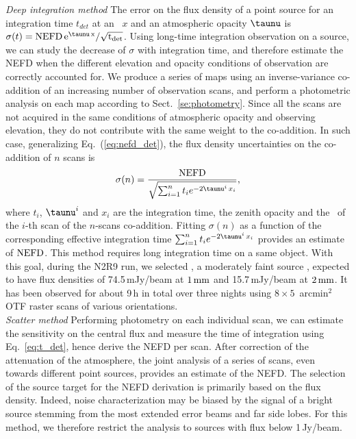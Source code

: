 \noindent \emph{Deep integration method} The error on the flux density of a
point source for an integration time $t_{det}$ at an \airmass\ $x$
and an atmospheric opacity $\taunu$ is
$\sigma(t) = \rm{NEFD}\,e^{\taunu \, x}/\sqrt{t_{\rm{det}}}$.
Using long-time integration observation on a source, we can study the
decrease of $\sigma$ with integration time, and
therefore estimate the NEFD when the different elevation and opacity conditions of
observation are correctly accounted for.  We produce a series of maps using an
inverse-variance co-addition of an increasing number of observation
scans, and perform a photometric analysis on each map according to
Sect.~\ref{se:photometry}. Since
all the scans are not acquired in the same conditions of atmospheric
opacity and observing elevation, they do not contribute with the same weight to
the co-addition. In such case, generalizing Eq.~(\ref{eq:nefd_det}),
the flux density uncertainties on the co-addition of $n$ scans is
%
\begin{equation}
  \sigma(n) = \frac{\rm{NEFD}}{\sqrt{\sum_{i=1}^{n}t_i e^{-2\taunu^i\, x_i}}},
  \label{eq:sigma_tau_w8}
\end{equation}
where $t_i$, $\taunu^i$ and $x_i$ are the integration time, the zenith
opacity and the \airmass\ of the $i$-th scan of the $n$-scans
co-addition. Fitting $\sigma(n)$ as a function of the corresponding effective
integration time $\sum_{i=1}^{n}t_i e^{-2\taunu^i\, x_i}$ provides an
estimate of $\rm{NEFD}$. This method requires long integration time on a same
object. With this goal, during the N2R9 run, we selected \hls, a moderately faint source
\citep{2012A&A...538L...4C}, expected to have flux densities of 74.5\,mJy/beam at $1\,\rm{mm}$
and 15.7\,mJy/beam at $2\, \rm{mm}$. %
It has been observed for about 9\,h in
total over three nights using $8 \times 5$~arcmin$^2$ OTF raster scans of various
orientations.\\

\noindent \emph{Scatter method} Performing photometry on each individual scan,
we can estimate the sensitivity on the central flux and measure the time of
integration using Eq.~\ref{eq:t_det}, hence derive the NEFD per
scan. After correction of the attenuation of the atmosphere, the joint
analysis of a series of scans, even towards different point sources, provides 
an estimate of the NEFD. The selection of the source target
for the NEFD derivation is primarily based on the flux density. Indeed, noise
characterization may be biased {\lp by the signal of a bright source
stemming from the most extended error beams and far side lobes.}
For this method, we therefore restrict the
analysis to sources with flux below 1\,Jy/beam.

